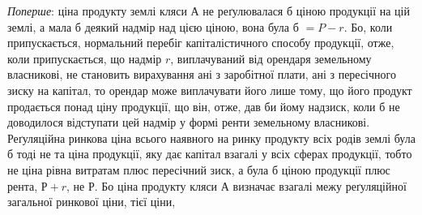 \emph{Поперше}: ціна продукту землі кляси $А$ не реґулювалася б ціною продукції
на цій землі, а мала б деякий надмір над цією ціною, вона була б
$= P - r$. Бо, коли припускається, нормальний перебіг капіталістичного способу
продукції, отже, коли припускається, що надмір $r$, виплачуваний від орендаря
земельному власникові, не становить вирахування ані з заробітної плати, ані
з пересічного зиску на капітал, то орендар може виплачувати його лише тому,
що його продукт продається понад ціну продукції, що він, отже, дав би йому
надзиск, коли б не доводилося відступати цей надмір у формі ренти земельному
власникові. Реґуляційна ринкова ціна всього наявного на ринку продукту
всіх родів землі була б тоді не та ціна продукції, яку дає капітал взагалі
у всіх сферах продукції, тобто не ціна рівна витратам плюс пересічний
зиск, а була б ціною продукції плюс рента, $Р + r$, не $Р$. Бо ціна продукту
кляси $А$ визначає взагалі межу реґуляційної загальної ринкової ціни, тієї ціни,
\parbreak{}  %

